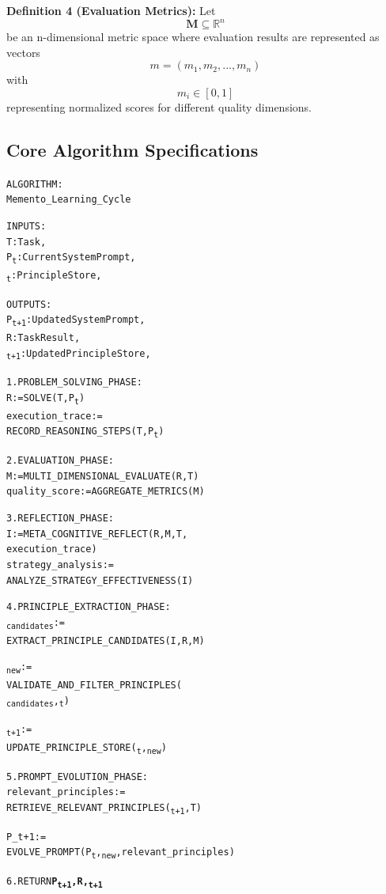 \documentclass[10pt,a4paper,twocolumn]{article}
\begin{document}
\textbf{Definition 4 (Evaluation Metrics):} Let 
\[\textbf{M} \subseteq \mathbb{R}^n\] be an n-dimensional metric space where evaluation results are represented as vectors \[m = (m_1, m_2, ..., m_n)\] with \[m_i \in [0,1]\] representing normalized scores for different quality dimensions.

\subsection{Core Algorithm Specifications}

\linebreak


\begin{alltt}

ALGORITHM: 
Memento\_Learning\_Cycle 

INPUTS: 
T: Task, 
P\textsubscript{t}: Current System Prompt,
\prod\textsubscript{t}: Principle Store, 

OUTPUTS: 
P\textsubscript{t+1}: Updated System Prompt , 
R: Task Result, 
\prod\textsubscript{t+1}: Updated Principle Store,


1. PROBLEM_SOLVING_PHASE:
   R := SOLVE(T, P\textsubscript{t})
   execution_trace :=
    RECORD_REASONING_STEPS(T, P\textsubscript{t})

   
2. EVALUATION_PHASE:
   M := MULTI_DIMENSIONAL_EVALUATE(R, T)
   quality_score := AGGREGATE_METRICS(M)
   
3. REFLECTION_PHASE:
   I := META_COGNITIVE_REFLECT(R, M, T, 
                        execution_trace)
   strategy_analysis := 
    ANALYZE_STRATEGY_EFFECTIVENESS(I)
   
4. PRINCIPLE_EXTRACTION_PHASE:
   \pi\textsubscript{candidates} := 
    EXTRACT_PRINCIPLE_CANDIDATES(I, R, M)

   \pi\textsubscript{new} :=
    VALIDATE_AND_FILTER_PRINCIPLES(
                          \pi\textsubscript{candidates},\prod\textsubscript{t})
                          
   \prod\textsubscript{t+1} :=
    UPDATE_PRINCIPLE_STORE(\prod\textsubscript{t}, \pi\textsubscript{new})

   
5. PROMPT_EVOLUTION_PHASE:
   relevant_principles :=
    RETRIEVE_RELEVANT_PRINCIPLES(\prod\textsubscript{t+1}, T)
    
   P_{t+1} := 
    EVOLVE_PROMPT(P\textsubscript{t}, \pi\textsubscript{new}, relevant_principles)
   
6. RETURN \textbf{P\textsubscript{t+1}, R, \prod\textsubscript{t+1}}

\end{alltt}
\end{document}
